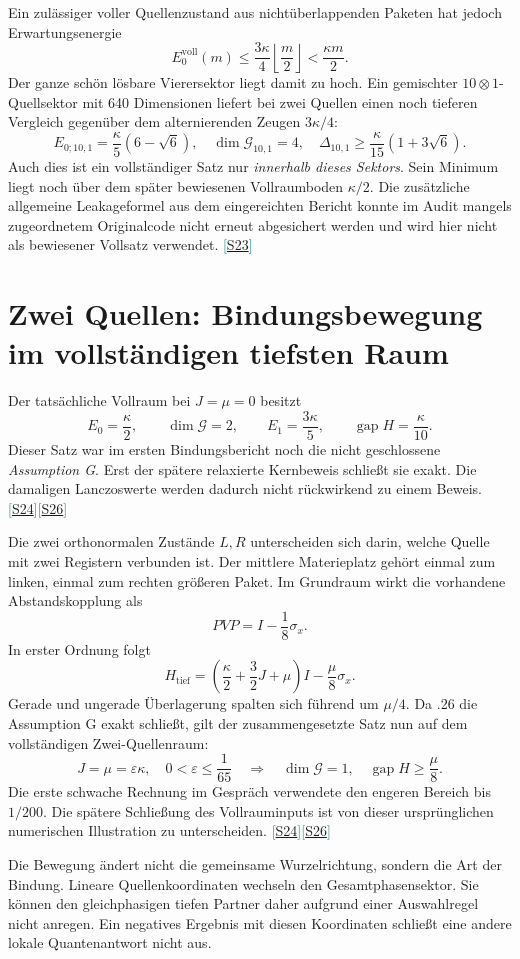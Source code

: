 \documentclass[11pt,a4paper,oneside,parskip=half,headings=normal,numbers=noenddot,bibliography=totoc]{scrreprt}
\newcommand{\gap}{\operatorname{gap}}
\newcommand{\src}[1]{\textcolor{teal}{\small[\hyperref[s:#1]{S#1}]}}
\newcommand{\finding}[2]{\begin{tcolorbox}[enhanced,breakable,colback=pale,colframe=teal,boxrule=0pt,borderline west={2pt}{0pt}{teal},arc=0mm,left=3mm,right=3mm,top=2mm,bottom=2mm,title={#1},coltitle=ink,colbacktitle=pale,fonttitle=\sffamily\bfseries]#2\end{tcolorbox}}
\begin{document}
Ein zulässiger voller Quellenzustand aus nichtüberlappenden Paketen hat jedoch Erwartungsenergie
\[
 E_0^{\mathrm{voll}}(m)\le\frac{3\kappa}{4}\left\lfloor\frac m2\right\rfloor
 <\frac{\kappa m}2.
\]
Der ganze schön lösbare Vierersektor liegt damit zu hoch. Ein gemischter $10\otimes1$-Quellsektor mit 640 Dimensionen liefert bei zwei Quellen einen noch tieferen Vergleich gegenüber dem alternierenden Zeugen $3\kappa/4$:
\[
 E_{0;10,1}=\frac\kappa5(6-\sqrt6),\quad
 \dim\mathcal G_{10,1}=4,\quad
 \Delta_{10,1}\ge\frac\kappa{15}(1+3\sqrt6).
\]
Auch dies ist ein vollständiger Satz nur \emph{innerhalb dieses Sektors}. Sein Minimum liegt noch über dem später bewiesenen Vollraumboden $\kappa/2$. Die zusätzliche allgemeine Leakageformel aus dem eingereichten Bericht konnte im Audit mangels zugeordnetem Originalcode nicht erneut abgesichert werden und wird hier nicht als bewiesener Vollsatz verwendet. \src{23}

\section{Zwei Quellen: Bindungsbewegung im vollständigen tiefsten Raum}
Der tatsächliche Vollraum bei $J=\mu=0$ besitzt
\[
 E_0=\frac\kappa2,\qquad\dim\mathcal G=2,\qquad
 E_1=\frac{3\kappa}5,\qquad\gap H=\frac\kappa{10}.
\]
Dieser Satz war im ersten Bindungsbericht noch die nicht geschlossene \emph{Assumption G}. Erst der spätere relaxierte Kernbeweis schließt sie exakt. Die damaligen Lanczoswerte werden dadurch nicht rückwirkend zu einem Beweis. \src{24}\src{26}

Die zwei orthonormalen Zustände $L,R$ unterscheiden sich darin, welche Quelle mit zwei Registern verbunden ist. Der mittlere Materieplatz gehört einmal zum linken, einmal zum rechten größeren Paket. Im Grundraum wirkt die vorhandene Abstandskopplung als
\[
 PVP=I-\frac18\sigma_x.
\]
In erster Ordnung folgt
\[
 H_{\mathrm{tief}}=
 \left(\frac\kappa2+\frac32J+\mu\right)I-\frac\mu8\sigma_x.
\]
Gerade und ungerade Überlagerung spalten sich führend um $\mu/4$. Da .26 die Assumption G exakt schließt, gilt der zusammengesetzte Satz nun auf dem vollständigen Zwei-Quellenraum:
\[
 J=\mu=\varepsilon\kappa,\quad0<\varepsilon\le\frac1{65}
 \quad\Longrightarrow\quad\dim\mathcal G=1,\quad\gap H\ge\frac\mu8.
\]
Die erste schwache Rechnung im Gespräch verwendete den engeren Bereich bis $1/200$. Die spätere Schließung des Vollrauminputs ist von dieser ursprünglichen numerischen Illustration zu unterscheiden. \src{24}\src{26}

\finding{Der wichtige blinde Fleck}{Die Bewegung ändert nicht die gemeinsame Wurzelrichtung, sondern die Art der Bindung. Lineare Quellenkoordinaten wechseln den Gesamtphasensektor. Sie können den gleichphasigen tiefen Partner daher aufgrund einer Auswahlregel nicht anregen. Ein negatives Ergebnis mit diesen Koordinaten schließt eine andere lokale Quantenantwort nicht aus.}
\end{document}
